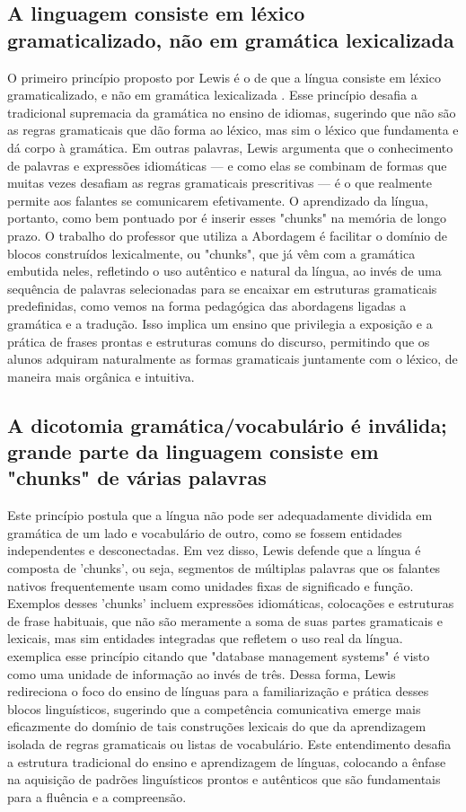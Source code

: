\subsection{A linguagem consiste em léxico gramaticalizado, não em gramática lexicalizada}

O primeiro princípio proposto por Lewis é o de que a língua consiste em léxico gramaticalizado, e não em gramática lexicalizada \cite[p. 1]{lewis1993}. Esse princípio desafia a tradicional supremacia da gramática no ensino de idiomas, sugerindo que não são as regras gramaticais que dão forma ao léxico, mas sim o léxico que fundamenta e dá corpo à gramática. Em outras palavras, Lewis argumenta que o conhecimento de palavras e expressões idiomáticas — e como elas se combinam de formas que muitas vezes desafiam as regras gramaticais prescritivas — é o que realmente permite aos falantes se comunicarem efetivamente. O aprendizado da língua, portanto, como bem pontuado por  é inserir esses "chunks" na memória de longo prazo. O trabalho do professor que utiliza a Abordagem é facilitar o domínio de blocos construídos lexicalmente, ou "chunks", que já vêm com a gramática embutida neles, refletindo o uso autêntico e natural da língua, ao invés de uma sequência de palavras selecionadas para se encaixar em estruturas gramaticais predefinidas, como vemos na forma pedagógica das abordagens ligadas a gramática e a tradução. Isso implica um ensino que privilegia a exposição e a prática de frases prontas e estruturas comuns do discurso, permitindo que os alunos adquiram naturalmente as formas gramaticais juntamente com o léxico, de maneira mais orgânica e intuitiva.

\subsection{A dicotomia gramática/vocabulário é inválida; grande parte da linguagem consiste em "chunks" de várias palavras}

Este princípio postula que a língua não pode ser adequadamente dividida em gramática de um lado e vocabulário de outro, como se fossem entidades independentes e desconectadas. Em vez disso, Lewis defende que a língua é composta de 'chunks', ou seja, segmentos de múltiplas palavras que os falantes nativos frequentemente usam como unidades fixas de significado e função. Exemplos desses 'chunks' incluem expressões idiomáticas, colocações e estruturas de frase habituais, que não são meramente a soma de suas partes gramaticais e lexicais, mas sim entidades integradas que refletem o uso real da língua.  exemplica esse princípio citando que "database management systems" é visto como uma unidade de informação ao invés de três. Dessa forma, Lewis redireciona o foco do ensino de línguas para a familiarização e prática desses blocos linguísticos, sugerindo que a competência comunicativa emerge mais eficazmente do domínio de tais construções lexicais do que da aprendizagem isolada de regras gramaticais ou listas de vocabulário. Este entendimento desafia a estrutura tradicional do ensino e aprendizagem de línguas, colocando a ênfase na aquisição de padrões linguísticos prontos e autênticos que são fundamentais para a fluência e a compreensão.

